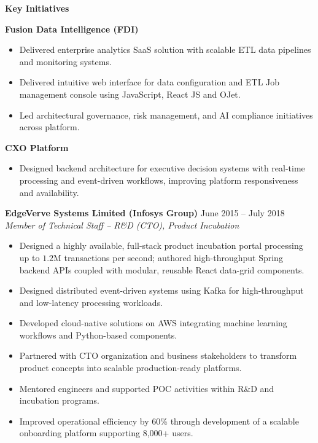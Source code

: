\documentclass[11pt,a4paper]{article}
\begin{document}
\textbf{Key Initiatives}

\textbf{Fusion Data Intelligence (FDI)}
\begin{itemize}
    \item Delivered enterprise analytics SaaS solution with scalable ETL data pipelines and monitoring systems.
    \item Delivered intuitive web interface for data configuration and ETL Job management console using JavaScript, React JS and OJet.
    \item Led architectural governance, risk management, and AI compliance initiatives across platform.
\end{itemize}

\textbf{CXO Platform}
\begin{itemize}
    \item Designed backend architecture for executive decision systems with real-time processing and event-driven workflows, improving platform responsiveness and availability.
\end{itemize}

\vspace{4pt}

\textbf{EdgeVerve Systems Limited (Infosys Group)} \hfill June 2015 -- July 2018 \\
\textit{Member of Technical Staff -- R\&D (CTO), Product Incubation}

\begin{itemize}
    \item Designed a highly available, full-stack product incubation portal processing up to $1.2\text{M}$ transactions per second; authored high-throughput Spring backend APIs coupled with modular, reusable React data-grid components.
    \item Designed distributed event-driven systems using Kafka for high-throughput and low-latency processing workloads.
    
    \item Developed cloud-native solutions on AWS integrating machine learning workflows and Python-based components.
    
    \item Partnered with CTO organization and business stakeholders to transform product concepts into scalable production-ready platforms.
    
    \item Mentored engineers and supported POC activities within R\&D and incubation programs.
    
    \item Improved operational efficiency by 60\% through development of a scalable onboarding platform supporting 8,000+ users.
\end{itemize}
\end{document}
